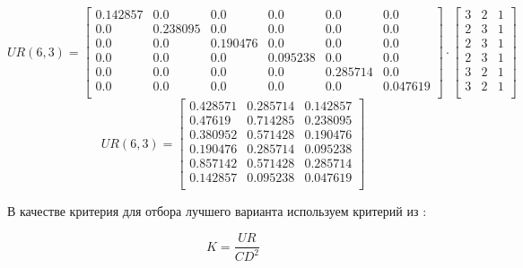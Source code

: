 $$
    UR(6,3) =
        \begin{bmatrix}
            0.142857 & 0.0      & 0.0      & 0.0      & 0.0      & 0.0      \\
            0.0      & 0.238095 & 0.0      & 0.0      & 0.0      & 0.0      \\
            0.0      & 0.0      & 0.190476 & 0.0      & 0.0      & 0.0      \\
            0.0      & 0.0      & 0.0      & 0.095238 & 0.0      & 0.0      \\
            0.0      & 0.0      & 0.0      & 0.0      & 0.285714 & 0.0      \\
            0.0      & 0.0      & 0.0      & 0.0      & 0.0      & 0.047619 \\
        \end{bmatrix}
        \cdot
        \begin{bmatrix}
            3 & 2 & 1 \\
            2 & 3 & 1 \\
            2 & 3 & 1 \\
            2 & 3 & 1 \\
            3 & 2 & 1 \\
            3 & 2 & 1 \\
        \end{bmatrix}
$$
\begin{equation}
        UR(6,3) =
        \begin{bmatrix}
            0.428571 & 0.285714 & 0.142857 \\
            0.47619  & 0.714285 & 0.238095 \\
            0.380952 & 0.571428 & 0.190476 \\
            0.190476 & 0.285714 & 0.095238 \\
            0.857142 & 0.571428 & 0.285714 \\
            0.142857 & 0.095238 & 0.047619 \\
        \end{bmatrix}
    \label{eq_cd_computing_form}
\end{equation}

В качестве критерия для отбора лучшего варианта используем
критерий из \cite[стр. 21]{econ_FSA}:

\begin{equation}
    K = \frac{UR}{CD^2}
    \label{eq_econ_best_var_form}
\end{equation}

